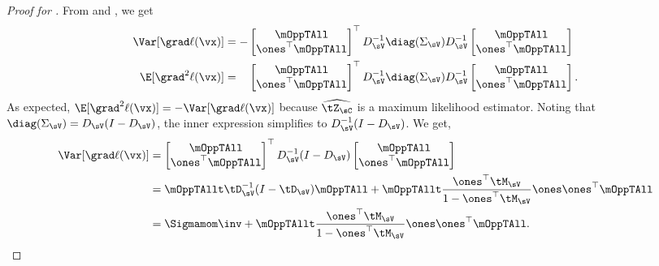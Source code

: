 \begin{proof}[Proof for ]
From  and , we get
  \begin{align*}
    \Var [\grad \ell(\vx)] &= -
        \begin{bmatrix}
          \mOppTAll \\
          \ones^\top \mOppTAll
        \end{bmatrix}^\top
          D_{\sV}^{-1} \diag(\Sigma_\sV) D_{\sV}^{-1} 
        \begin{bmatrix}
          \mOppTAll \\
          \ones^\top \mOppTAll
        \end{bmatrix} \\
        \E[\grad^2 \ell(\vx)] 
        &= \hphantom{-}
        \begin{bmatrix}
          \mOppTAll \\
          \ones^\top \mOppTAll
        \end{bmatrix}^\top
          D_{\sV}^{-1} \diag(\Sigma_\sV) D_{\sV}^{-1} 
        \begin{bmatrix}
          \mOppTAll \\
          \ones^\top \mOppTAll
        \end{bmatrix}.
  \end{align*}
As expected, $\E[\grad^2 \ell(\vx)] = -\Var [\grad \ell(\vx)]$ because
$\widehat{\tZ_\sC}$ is a maximum likelihood estimator. 
Noting that $\diag(\Sigma_\sV) = D_\sV (I - D_\sV)$, the inner
  expression simplifies to $D_\sV^{-1} (I - D_\sV)$. We get,
\begin{align*}
  \Var [\grad \ell(\vx)] &=
      \begin{bmatrix}
        \mOppTAll \\
        \ones^\top \mOppTAll
      \end{bmatrix}^\top
        D_{\sV}^{-1} (I - D_\sV) 
      \begin{bmatrix}
        \mOppTAll \\
        \ones^\top \mOppTAll
      \end{bmatrix} \\
   &=
    \mOppTAllt \tD_{\sV}^{-1} (I - \tD_\sV) \mOppTAll + \mOppTAllt \frac{\ones^\top \tM_\sV}{1 - \ones^\top \tM_\sV} \ones\ones^\top \mOppTAll \\
   &= {\Sigmamom}\inv + \mOppTAllt \frac{\ones^\top \tM_\sV}{1 - \ones^\top \tM_\sV} \ones\ones^\top \mOppTAll.
\end{align*}


\end{proof}
